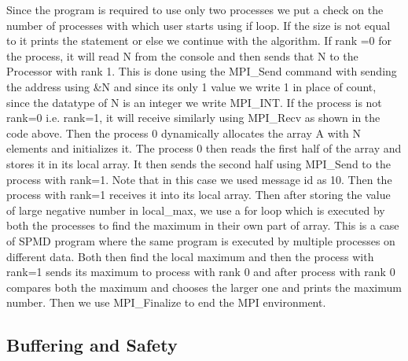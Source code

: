 \documentclass[12pt]{article}
\begin{document}
Since the program is required to use only two processes we put a check on the number of processes with which user starts using if loop. If the size is not equal to it prints the statement or else we continue with the algorithm. If rank =0 for the process, it will read N from the console and then sends that N to the Processor with rank 1. This is done using the MPI\_Send command with sending the address using \&N and since its only 1 value we write 1 in place of count, since the datatype of N is an integer we write MPI\_INT. If the process is not rank=0 i.e. rank=1, it will receive similarly using MPI\_Recv as shown in the code above. Then the process 0 dynamically allocates the array A with N elements and initializes it. The process 0 then reads the first half of the array and stores it in its local array. It then sends the second half using MPI\_Send to the process with rank=1. Note that in this case we used message id as 10. Then the process with rank=1 receives it into its local array. 
Then after storing the value of large negative number in local\_max, we use a for loop which is executed by both the processes to find the maximum in their own part of array. This is a case of SPMD program where the same program is executed by multiple processes on different data. Both then find the local maximum and then the process with rank=1 sends its maximum to process with rank 0 and after process with rank 0 compares both the maximum and chooses the larger one and prints the maximum number. Then we use MPI\_Finalize to end the MPI environment.

\subsection{Buffering and Safety}
\end{document}
